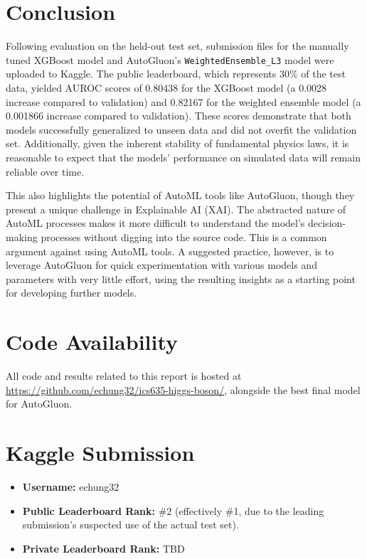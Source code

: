 \documentclass[letterpaper]{article}
\begin{document}
	\section{Conclusion}
		
	Following evaluation on the held-out test set, submission files for the manually tuned XGBoost model and AutoGluon's \texttt{WeightedEnsemble\_L3} model were uploaded to Kaggle. The public leaderboard, which represents 30\% of the test data, yielded AUROC scores of 0.80438 for the XGBoost model (a 0.0028 increase compared to validation) and 0.82167 for the weighted ensemble model (a 0.001866 increase compared to validation). These scores demonstrate that both models successfully generalized to unseen data and did not overfit the validation set. Additionally, given the inherent stability of fundamental physics laws, it is reasonable to expect that the models' performance on simulated data will remain reliable over time.
	
	This also highlights the potential of AutoML tools like AutoGluon, though they present a unique challenge in Explainable AI (XAI). The abstracted nature of AutoML processes makes it more difficult to understand the model's decision-making processes without digging into the source code. This is a common argument against using AutoML tools. A suggested practice, however, is to leverage AutoGluon for quick experimentation with various models and parameters with very little effort, using the resulting insights as a starting point for developing further models.
	
	\section{Code Availability}
	All code and results related to this report is hosted at \url{https://github.com/echung32/ics635-higgs-boson/}, alongside the best final model for AutoGluon.
	
	\section{Kaggle Submission}
	
	\begin{itemize}
	    \item \textbf{Username:} echung32
		\item \textbf{Public Leaderboard Rank:} \#2 (effectively \#1, due to the leading submission's suspected use of the actual test set).
		\item \textbf{Private Leaderboard Rank:} TBD
	\end{itemize}
\end{document}
